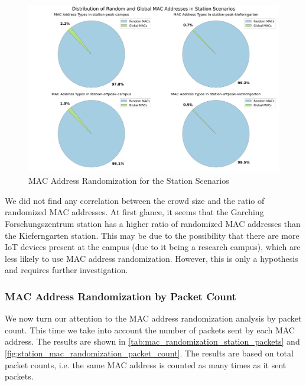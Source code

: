 \documentclass[sigconf,nonacm]{acmart}
\begin{document}
\begin{figure}
    \centering
    \includegraphics[width=\columnwidth]{images/part1/mac-address-types/station-scenarios.png}
    \caption{MAC Address Randomization for the Station Scenarios}
    \label{fig:station_mac_randomization}
\end{figure}

We did not find any correlation between the crowd size and the ratio of randomized MAC addresses. At first glance, it seems that the Garching Forschungszentrum station has a higher ratio of randomized MAC addresses than the Kieferngarten station. This may be due to the possibility that there are more IoT devices present at the campus (due to it being a research campus), which are less likely to use MAC address randomization. However, this is only a hypothesis and requires further investigation.

\subsubsection{MAC Address Randomization by Packet Count}
\label{sec:part-1/station/mac-randomization-packet-count}

We now turn our attention to the MAC address randomization analysis by packet count. This time we take into account the number of packets sent by each MAC address. The results are shown in \cref{tab:mac_randomization_station_packets} and \cref{fig:station_mac_randomization_packet_count}. The results are based on total packet counts, i.e. the same MAC address is counted as many times as it sent packets.
\end{document}
